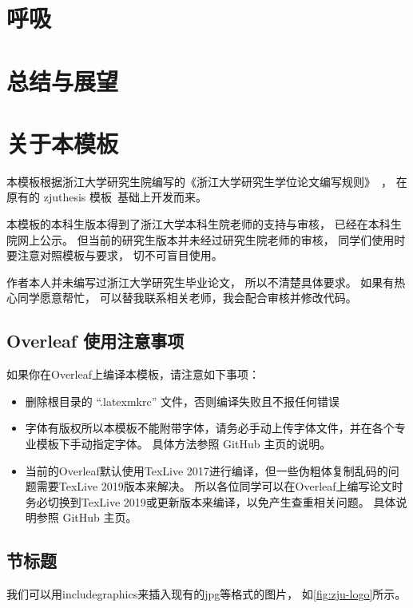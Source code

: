 \chapter{呼吸}

\chapter{总结与展望}

\chapter{关于本模板}

本模板根据浙江大学研究生院编写的《浙江大学研究生学位论文编写规则》~\cite{zjugradthesisrules}，
在原有的 zjuthesis 模板~\cite{zjuthesis}基础上开发而来。

本模板的本科生版本\cite{zjuthesisrules}得到了浙江大学本科生院老师的支持与审核，
已经在本科生院网上公示。
但当前的研究生版本并未经过研究生院老师的审核，
同学们使用时要注意对照模板与要求，
切不可盲目使用。

作者本人并未编写过浙江大学研究生毕业论文，
所以不清楚具体要求。
如果有热心同学愿意帮忙，
可以替我联系相关老师，我会配合审核并修改代码。

\section{Overleaf 使用注意事项}

如果你在Overleaf上编译本模板，请注意如下事项：

\begin{itemize}
    \item 删除根目录的 ``.latexmkrc'' 文件，否则编译失败且不报任何错误
    \item 字体有版权所以本模板不能附带字体，请务必手动上传字体文件，并在各个专业模板下手动指定字体。
          具体方法参照 GitHub 主页的说明。
    \item 当前的Overleaf默认使用TexLive 2017进行编译，但一些伪粗体复制乱码的问题需要TexLive 2019版本来解决。
          所以各位同学可以在Overleaf上编写论文时务必切换到TexLive 2019或更新版本来编译，以免产生查重相关问题。
          具体说明参照 GitHub 主页。
\end{itemize}


\section{节标题}

我们可以用includegraphics来插入现有的jpg等格式的图片，
如\autoref{fig:zju-logo}所示。

